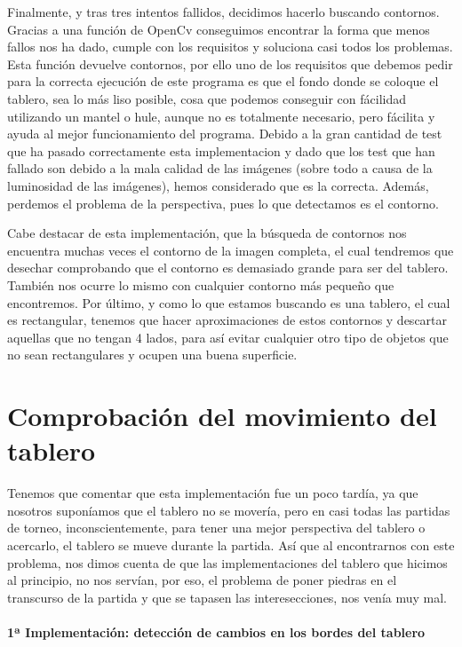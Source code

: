 \documentclass[12pt,a4paper]{report}
\begin{document}
Finalmente, y tras tres intentos fallidos, decidimos hacerlo buscando contornos.
Gracias a una función de OpenCv conseguimos encontrar la forma que menos fallos
nos ha dado, cumple con los requisitos y soluciona casi todos los problemas.
Esta función devuelve contornos, por ello uno de los requisitos que debemos
pedir para la correcta ejecución de este programa es que el fondo donde se
coloque el tablero, sea lo más liso posible, cosa que podemos conseguir con
fácilidad utilizando un mantel o hule, aunque no es totalmente necesario, pero
fácilita y ayuda al mejor funcionamiento del programa. Debido a la gran cantidad
de test que ha pasado correctamente esta implementacion y dado que los test que
han fallado son debido a la mala calidad de las imágenes (sobre todo a causa de
la luminosidad de las imágenes), hemos considerado que es la correcta. Además,
perdemos el problema de la perspectiva, pues lo que detectamos es el contorno.

Cabe destacar de esta implementación, que la búsqueda de contornos nos encuentra
muchas veces el contorno de la imagen completa, el cual tendremos que desechar
comprobando que el contorno es demasiado grande para ser del tablero. También
nos ocurre lo mismo con cualquier contorno más pequeño que encontremos. Por
último, y como lo que estamos buscando es una tablero, el cual es rectangular,
tenemos que hacer aproximaciones de estos contornos y descartar aquellas que no
tengan 4 lados, para así evitar cualquier otro tipo de objetos que no sean
rectangulares y ocupen una buena superficie. 




\section{Comprobación del movimiento del tablero}

Tenemos que comentar que esta implementación fue un poco tardía, ya que nosotros
suponíamos que el tablero no se movería, pero en casi todas las partidas de
torneo, inconscientemente, para tener una mejor perspectiva del tablero o
acercarlo, el tablero se mueve durante la partida. Así que al encontrarnos con
este problema, nos dimos cuenta de que las implementaciones del tablero que
hicimos al principio, no nos servían, por eso, el problema de poner piedras en
el transcurso de la partida y que se tapasen las interesecciones, nos venía muy
mal. 

\paragraph{1ª Implementación: detección de cambios en los bordes del tablero}
\end{document}
